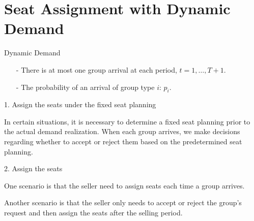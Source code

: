 
\section{Seat Assignment with Dynamic Demand}
    \frame{\sectionpage}

\begin{frame}{Dynamic Demand}
  \begin{itemize}
    \item[-] There is at most one group arrival at each period, $t = 1, \ldots, T+1$. 
    \item[-] The probability of an arrival of group type $i$: $p_i$.  
  \end{itemize}

  1. Assign the seats under the fixed seat planning

  \begin{footnotesize}
  In certain situations, it is necessary to determine a fixed seat planning prior to the actual demand realization. When each group arrives, we make decisions regarding whether to accept or reject them based on the predetermined seat planning.
  \end{footnotesize}

  2. Assign the seats

  \begin{footnotesize}
  One scenario is that the seller need to assign seats each time a group arrives. 
  
  Another scenario is that the seller only needs to accept or reject the group's request and then assign the seats after the selling period.
  \end{footnotesize}
\end{frame}

